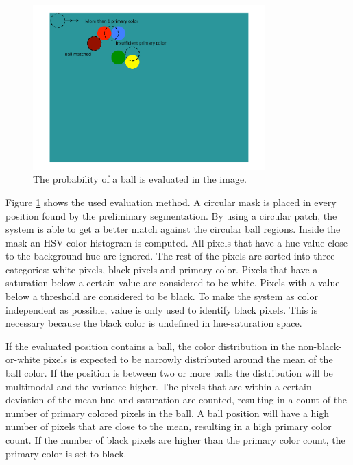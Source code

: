 \begin{figure}[h]
\begin{center}
\includegraphics[width=0.8\textwidth]{images/ballfind.pdf}
\caption{The probability of a ball is evaluated in the image.}
\label{fig:ballfind}
\end{center}
\end{figure}
Figure \ref{fig:ballfind} shows the used evaluation method. A circular mask is placed in every position found by the preliminary segmentation. By using a circular patch, the system is able to get a better match against the circular ball regions. Inside the mask an HSV color histogram is computed. All pixels that have a hue value close to the background hue are ignored. The rest of the pixels are sorted into three categories: white pixels, black pixels and primary color. Pixels that have a saturation below a certain value are considered to be white. Pixels with a value below a threshold are considered to be black. To make the system as color independent as possible, value is only used to identify black pixels. This is necessary because the black color is undefined in hue-saturation space.

If the evaluated position contains a ball, the color distribution in the non-black-or-white pixels is expected to be narrowly distributed around the mean of the ball color. If the position is between two or more balls the distribution will be multimodal and the variance higher. The pixels that are within a certain deviation of the mean hue and saturation are counted, resulting in a count of the number of primary colored pixels in the ball. A ball position will have a high number of pixels that are close to the mean, resulting in a high primary color count. If the number of black pixels are higher than the primary color count, the primary color is set to black.

